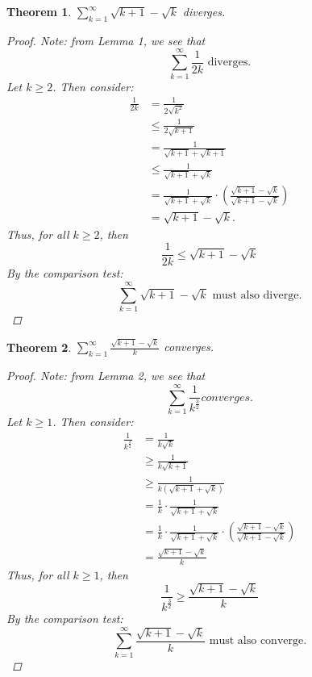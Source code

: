 \documentclass{amsart}
\newtheorem{theorem}{Theorem}
\begin{document}
\begin{enumerate}[1.]
\begin{theorem}
    $\displaystyle \sum_{k=1}^\infty \sqrt{k+1}-\sqrt{k}$ diverges.
    \begin{proof}
        Note: from Lemma 1, we see that
        \[
            \displaystyle \sum_{k=1}^\infty \frac{1}{2k} \text{ diverges}.    
        \]
        Let $k \geq 2$. Then consider:
        \begin{align*}
            \frac{1}{2k} &= \frac{1}{2\sqrt{k^2}} \\
            &\leq \frac{1}{2\sqrt{k+1}} \\
            &= \frac{1}{\sqrt{k+1} + \sqrt{k+1}} \\
            &\leq \frac{1}{\sqrt{k+1} + \sqrt{k}} \\
            &= \frac{1}{\sqrt{k+1} + \sqrt{k}} \cdot \left( \frac{\sqrt{k+1} - \sqrt{k}}{\sqrt{k+1} - \sqrt{k}} \right) \\
            &= \sqrt{k+1} - \sqrt{k}.
        \end{align*}
        Thus, for all $k \geq 2$, then
        \[
            \frac{1}{2k} \leq \sqrt{k + 1} - \sqrt{k}
        \]
        By the comparison test:
        \[
            \sum_{k=1}^\infty \sqrt{k+1}-\sqrt{k} \text{ must also diverge.}
        \]
    \end{proof}
\end{theorem}
\begin{theorem}
    $\displaystyle \sum_{k=1}^\infty \frac{\sqrt{k+1}-\sqrt{k}}{k}$ converges.
    \begin{proof}
        Note: from Lemma 2, we see that
        \[
            \displaystyle \sum_{k=1}^\infty \frac{1}{k^{\frac{3}{2}}} converges.
        \]
        Let $k \geq 1$. Then consider:
        \begin{align*}
            \frac{1}{k^{\frac{3}{2}}} &= \frac{1}{k\sqrt{k}} \\
            &\geq \frac{1}{k\sqrt{k+1}} \\
            &\geq \frac{1}{k(\sqrt{k+1} + \sqrt{k})} \\
            &= \frac{1}{k} \cdot \frac{1}{\sqrt{k+1} + \sqrt{k}} \\
            &= \frac{1}{k} \cdot \frac{1}{\sqrt{k+1} + \sqrt{k}} \cdot \left( \frac{\sqrt{k+1} - \sqrt{k}}{\sqrt{k+1} - \sqrt{k}} \right) \\
            &= \frac{\sqrt{k+1} - \sqrt{k}}{k}
        \end{align*}
        Thus, for all $k \geq 1$, then
        \[
            \frac{1}{k^{\frac{3}{2}}} \geq \frac{\sqrt{k + 1} - \sqrt{k}}{k}
        \]
        By the comparison test:
        \[
            \displaystyle \sum_{k=1}^\infty \frac{\sqrt{k+1}-\sqrt{k}}{k} \text{ must also converge.}
        \]
    \end{proof}
\end{theorem}


\end{enumerate}
\end{document}
